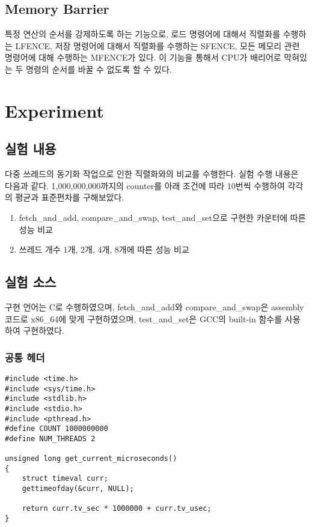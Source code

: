 \documentclass[11pt, a4paper]{article}
\begin{document}
\subsection{Memory Barrier}
특정 연산의 순서를 강제하도록 하는 기능으로, 로드 명령어에 대해서 직렬화를 수행하는 LFENCE, 저장 명령어에 대해서 직렬화를 수행하는 SFENCE, 모든 메모리 관련 명령어에 대해 수행하는 MFENCE가 있다. 이 기능을 통해서 CPU가 배리어로 막혀있는 두 명령의 순서를 바꿀 수 없도록 할 수 있다.

\section{Experiment}

\subsection{실험 내용}
다중 쓰레드의 동기화 작업으로 인한 직렬화와의 비교를 수행한다. 실험 수행 내용은 다음과 같다.
1,000,000,000까지의 counter를 아래 조건에 따라 10번씩 수행하여 각각의 평균과 표준편차를 구해보았다.

\begin{enumerate}
	\item fetch\_and\_add, compare\_and\_swap, test\_and\_set으로 구현한 카운터에 따른 성능 비교
	\item 쓰레드 개수 1개, 2개, 4개, 8개에 따른 성능 비교
\end{enumerate}

\subsection{실험 소스}
구현 언어는 C로 수행하였으며, fetch\_and\_add와 compare\_and\_swap은 assembly 코드로 x86\_64에 맞게 구현하였으며, test\_and\_set은 GCC의 built-in 함수를 사용하여 구현하였다. 

\subsubsection{공통 헤더}

\begin{lstlisting}
#include <time.h>
#include <sys/time.h>
#include <stdlib.h>
#include <stdio.h>
#include <pthread.h>
#define COUNT 1000000000
#define NUM_THREADS 2

unsigned long get_current_microseconds()
{
	struct timeval curr;
	gettimeofday(&curr, NULL);

	return curr.tv_sec * 1000000 + curr.tv_usec;
}
\end{lstlisting}
\end{document}
